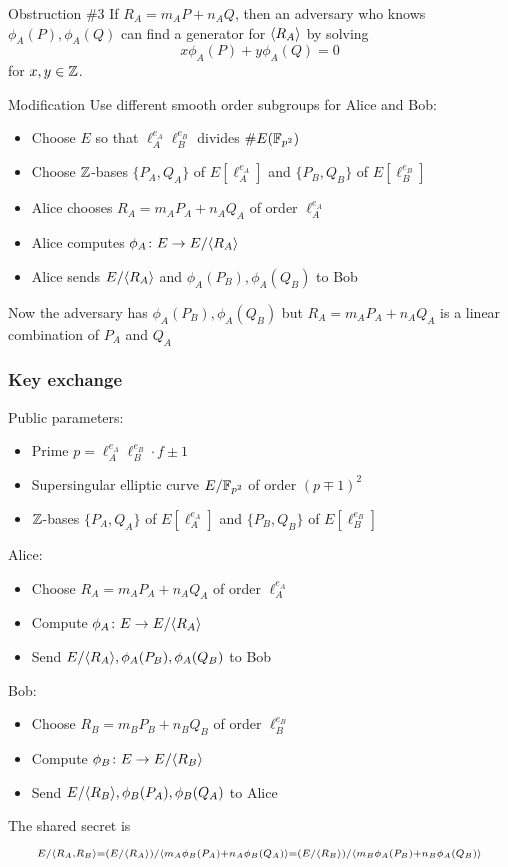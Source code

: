 \documentclass{beamer}
\begin{document}
\begin{frame}
\begin{block}{Obstruction \#3}
If $R_A = m_A P + n_A Q$, then an adversary who knows $\phi_A(P),
\phi_A(Q)$ can find a generator for $\langle R_A\rangle$ by solving
\[
x \phi_A(P) + y \phi_A(Q) = 0
\]
for $x,y \in \mathbb{Z}$.
\end{block}
\begin{block}{Modification}
Use different smooth order subgroups for Alice and Bob:
\begin{itemize}
\item Choose $E$ so that $\ell_A^{e_A} \ell_B^{e_B}$ divides
  $\#E(\mathbb{F}_{p^2})$
\item Choose $\mathbb{Z}$-bases $\{P_A,Q_A\}$ of $E[\ell_A^{e_A}]$ and
  $\{P_B,Q_B\}$ of $E[\ell_B^{e_B}]$
\item Alice chooses $R_A = m_A P_A + n_A Q_A$ of order $\ell_A^{e_A}$
\item Alice computes $\phi_A\colon E \to E/\langle R_A\rangle$
\item Alice sends $E/\langle R_A\rangle$ and $\phi_A(P_B),\phi_A(Q_B)$ to Bob
\end{itemize}
Now the adversary has $\phi_A(P_B),\phi_A(Q_B)$ but $R_A = m_A P_A +
n_A Q_A$ is a linear combination of $P_A$ and $Q_A$
\end{block}
\end{frame}

\begin{frame}
\frametitle{Key exchange}
Public parameters:
\begin{itemize}
\item Prime $p = \ell_A^{e_A} \ell_B^{e_B}\cdot f \pm 1$
\item Supersingular elliptic curve $E/\mathbb{F}_{p^2}$ of order $(p\mp 1)^2$
\item $\mathbb{Z}$-bases $\{P_A,Q_A\}$ of $E[\ell_A^{e_A}]$ and
  $\{P_B,Q_B\}$ of $E[\ell_B^{e_B}]$
\end{itemize}
Alice:
\begin{itemize}
\item Choose $R_A = m_A P_A + n_A Q_A$ of order $\ell_A^{e_A}$
\item Compute $\phi_A\colon E \to E/\langle R_A\rangle$
\item Send $E/\langle R_A\rangle, \phi_A(P_B), \phi_A(Q_B)$ to Bob
\end{itemize}
Bob:
\begin{itemize}
\item Choose $R_B = m_B P_B + n_B Q_B$ of order $\ell_B^{e_B}$
\item Compute $\phi_B\colon E \to E/\langle R_B\rangle$
\item Send $E/\langle R_B\rangle, \phi_B(P_A), \phi_B(Q_A)$ to Alice
\end{itemize}
The shared secret is
\[
\scriptstyle
E/\langle R_A,R_B\rangle = (E/\langle R_A\rangle)/{\langle m_A \phi_B(P_A) +
  n_A \phi_B(Q_A)\rangle} = (E/\langle R_B\rangle)/{\langle m_B \phi_A(P_B) +
  n_B \phi_A(Q_B)\rangle}
\]
\end{frame}
\end{document}
